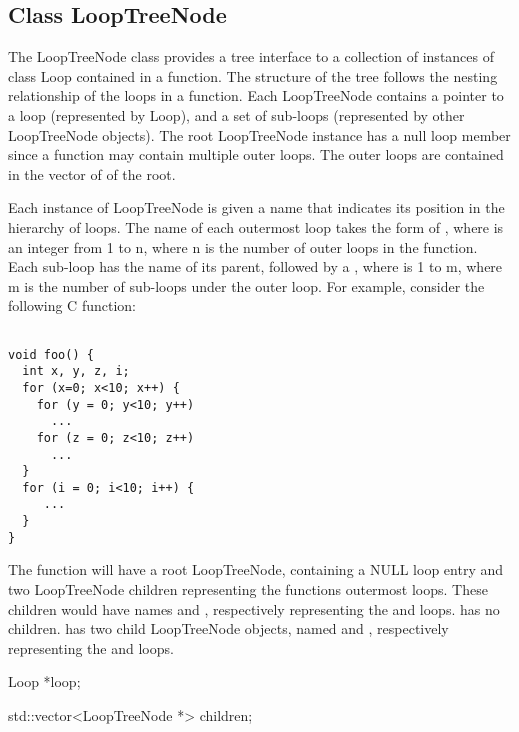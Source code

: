 \subsection{Class LoopTreeNode}
The LoopTreeNode class provides a tree interface to a collection of instances of class 
Loop contained in a function. The structure of the tree 
follows the nesting relationship of the loops in a function. 
Each LoopTreeNode contains a pointer to a loop (represented by Loop), and a set
of sub-loops (represented by other LoopTreeNode objects). The root 
LoopTreeNode instance has a null loop member since a function may contain multiple outer 
loops. The outer loops are contained in the vector of  of the root. 

Each instance of LoopTreeNode is given a name that indicates its position in the hierarchy of loops.
The name of each outermost loop takes the form of , 
where  is an integer from 1 to n,
where n is the number of outer loops in the function.
Each sub-loop has the name of its parent,
followed by a , where  is 1 to m, where m is the number of sub-loops under the outer loop.  
For example, consider the following C function:

\lstset{showstringspaces=false, numbers=none}

\begin{lstlisting}

void foo() {
  int x, y, z, i;
  for (x=0; x<10; x++) {
    for (y = 0; y<10; y++)
      ...
    for (z = 0; z<10; z++)
      ...
  }
  for (i = 0; i<10; i++) {
     ...
  }
}
\end{lstlisting}

The  function will have a root LoopTreeNode, containing a NULL loop entry and 
two LoopTreeNode children representing the functions outermost loops. These children 
would have names  and , respectively representing the  and  loops.  has 
no children.  has two child LoopTreeNode objects, named  and 
, respectively representing the  and  loops. 

\begin{apient}
Loop *loop;
\end{apient}

\begin{apient}
std::vector<LoopTreeNode *> children;
\end{apient}
    
